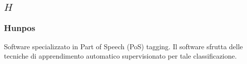 \subsection*{\quad$H\quad$}
\subsubsection*{Hunpos}
Software specializzato in Part of Speech (PoS) tagging\glo. Il software sfrutta delle tecniche di apprendimento automatico supervisionato per tale classificazione.  

